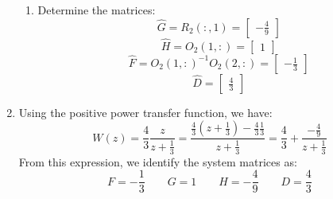 \begin{enumerate}
\begin{enumerate}
            \item Determine the matrices:
                \[\hat{G}=R_2(:,1)=\begin{bmatrix} -\frac{4}{9} \end{bmatrix}\]
                \[\hat{H}=O_2(1,:)=\begin{bmatrix} 1 \end{bmatrix}\]
                \[\hat{F}=O_2(1,:)^{-1}O_2(2,:)=\begin{bmatrix} -\frac{1}{3} \end{bmatrix}\]
                \[\hat{D}=\begin{bmatrix} \frac{4}{3} \end{bmatrix}\]
        \end{enumerate}
    \item Using the positive power transfer function, we have:
        \[W(z)=\dfrac{4}{3}\dfrac{z}{z+\frac{1}{3}}=\dfrac{\frac{4}{3}\left(z+\frac{1}{3}\right)-\frac{4}{3}\frac{1}{3}}{z+\frac{1}{3}}=\dfrac{4}{3}+\dfrac{-\frac{4}{9}}{z+\frac{1}{3}}\]
        From this expression, we identify the system matrices as:
        \[F=-\dfrac{1}{3} \qquad G=1 \qquad H=-\dfrac{4}{9} \qquad D=\dfrac{4}{3}\]
\end{enumerate}